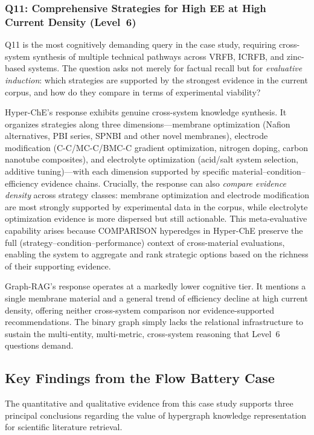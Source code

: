 \subsubsection{Q11: Comprehensive Strategies for High EE at High Current Density (Level~6)}

Q11 is the most cognitively demanding query in the case study, requiring cross-system synthesis of multiple technical pathways across VRFB, ICRFB, and zinc-based systems. The question asks not merely for factual recall but for \emph{evaluative induction}: which strategies are supported by the strongest evidence in the current corpus, and how do they compare in terms of experimental viability?

Hyper-ChE's response exhibits genuine cross-system knowledge synthesis. It organizes strategies along three dimensions---membrane optimization (Nafion alternatives, PBI series, SPNBI and other novel membranes), electrode modification (C-C/MC-C/BMC-C gradient optimization, nitrogen doping, carbon nanotube composites), and electrolyte optimization (acid/salt system selection, additive tuning)---with each dimension supported by specific material--condition--efficiency evidence chains. Crucially, the response can also \emph{compare evidence density} across strategy classes: membrane optimization and electrode modification are most strongly supported by experimental data in the corpus, while electrolyte optimization evidence is more dispersed but still actionable. This meta-evaluative capability arises because COMPARISON hyperedges in Hyper-ChE preserve the full (strategy--condition--performance) context of cross-material evaluations, enabling the system to aggregate and rank strategic options based on the richness of their supporting evidence.

Graph-RAG's response operates at a markedly lower cognitive tier. It mentions a single membrane material and a general trend of efficiency decline at high current density, offering neither cross-system comparison nor evidence-supported recommendations. The binary graph simply lacks the relational infrastructure to sustain the multi-entity, multi-metric, cross-system reasoning that Level~6 questions demand.

\subsection{Key Findings from the Flow Battery Case}
\label{subsec:flow_battery_findings}

The quantitative and qualitative evidence from this case study supports three principal conclusions regarding the value of hypergraph knowledge representation for scientific literature retrieval.

